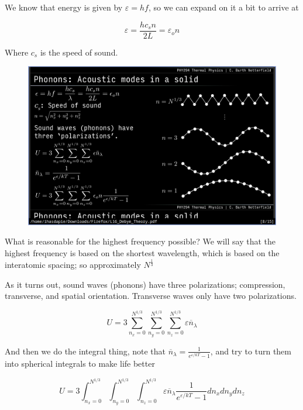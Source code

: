 \documentclass[10pt]{article}
\begin{document}
We know that energy is given by $ \varepsilon = hf $, so we can expand on it a bit to arrive at

\begin{equation}
	\varepsilon  = \frac{hc_s n}{2L} = \varepsilon_o n 
\end{equation}

Where $ c_s $ is the speed of sound. 


\begin{figure}[H]
	\centering
	\includegraphics[width=0.8\linewidth]{img/294_acoustic_modes.png}
\end{figure}


What is reasonable for the highest frequency possible? We will say that the highest frequency is based on the shortest wavelength, which is based on the interatomic spacing; so approximately $ N^{\frac{1}{3}} $ 

As it turns out, sound waves (phonons) have three polarizations; compression, transverse, and spatial orientation. Transverse waves only have two polarizations.

\begin{equation}
	U = 3 
	\sum^{N^{1 /3}}_{n_x = 0}
	\sum^{N^{1 /3}}_{n_y = 0}
	\sum^{N^{1 /3}}_{n_z = 0}
	\varepsilon \overline{n}_\lambda
\end{equation}

And then we do the integral thing, note that $ \overline{n}_\lambda = \frac{1}{e^{\varepsilon /kT} - 1} $, and try to turn them into spherical integrals to make life better


\begin{equation}
	U = 3 
	\int^{N^{1 /3}}_{n_x = 0}
	\int^{N^{1 /3}}_{n_y = 0}
	\int^{N^{1 /3}}_{n_z = 0}
	\varepsilon \overline{n}_\lambda  \frac{1}{e^{\varepsilon /kT} - 1} 
	dn_x dn_y dn_z
\end{equation}
\end{document}
